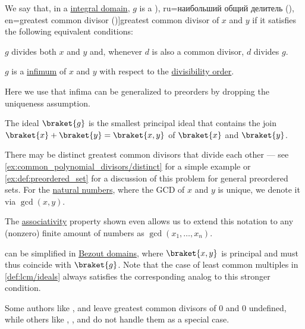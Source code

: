 \begin{definition}\label{def:gcd}
  We say that, in a \hyperref[def:integral_domain]{integral domain}, \( g \) is a \term[bg=най-голям общ делител (на два полинома) (\cite[173]{Обрешков1962ВисшаАлгебра}), ru=наибольший общий делитель (\cite[def. 3.5.3]{Винберг2014КурсАлгебры}), en=greatest common divisor (\cite[def. V.2.2]{Aluffi2009Algebra})]{greatest common divisor} of \( x \) and \( y \) if it satisfies the following equivalent conditions:

  \begin{thmenum}
     \( g \) divides both \( x \) and \( y \) and, whenever \( d \) is also a common divisor, \( d \) divides \( g \).

     \( g \) is a \hyperref[def:extremal_points/supremum_and_infimum]{infimum} of \( x \) and \( y \) with respect to the \hyperref[thm:semiring_divisibility_order]{divisibility order}.

    Here we use that infima can be generalized to preorders by dropping the uniqueness assumption.

     The ideal \( \braket{ g } \) is the smallest principal ideal that contains the join \( \braket{ x } + \braket{ y } = \braket{ x, y } \) of \( \braket{ x } \) and \( \braket{ y } \).
  \end{thmenum}
\end{definition}
\begin{comments}
  \item There may be distinct greatest common divisors that divide each other --- see \cref{ex:common_polynomial_divisors/distinct} for a simple example or \cref{ex:def:preordered_set} for a discussion of this problem for general preordered sets. For the \hyperref[def:natural_numbers]{natural numbers}, where the GCD of \( x \) and \( y \) is unique, we denote it via \( \gcd(x, y) \).

  The \hyperref[def:binary_operation/associative]{associativity} property shown  even allows us to extend this notation to any (nonzero) finite amount of numbers as \( \gcd(x_1, \ldots, x_n) \).

  \item {} can be simplified in \hyperref[def:bezout_domain]{Bezout domains}, where \( \braket{ x, y } \) is principal and must thus coincide with \( \braket{ g } \). Note that the case of least common multiples in \cref{def:lcm/ideals} always satisfies the corresponding analog to this stronger condition.

  \item Some authors like \textcite[111]{Lang2002Algebra}, \textcite[144]{Jacobson1985BasicAlgebraI} and \textcite[2]{Knapp2016BasicAlgebra} leave greatest common divisors of \( 0 \) and \( 0 \) undefined, while others like \textcite[304]{Rotman2015AdvancedModernAlgebraPart1}, \textcite[def. V.2.2]{Aluffi2009Algebra}, \textcite[119]{Винберг2014КурсАлгебры} and \textcite[143]{ГеновМиховскиМоллов1991Алгебра} do not handle them as a special case.
\end{comments}
